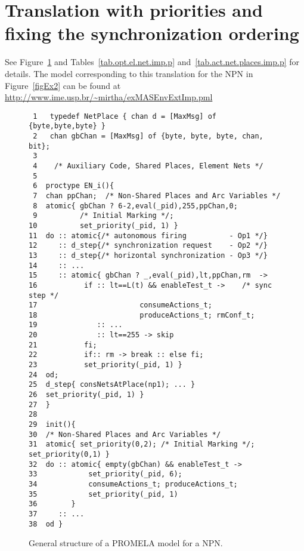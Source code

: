 \documentclass{llncs}
\begin{document}
\newpage
\section{Translation with priorities and fixing the synchronization ordering}
\label{app:imp.trans}

See Figure~\ref{figStructNPNimpP} and Tables~\ref{tab.opt.el.net.imp.p} and~\ref{tab.act.net.places.imp.p} for details. The model corresponding to this translation for the NPN in Figure~\ref{figEx2} can be found at \small\url{http://www.ime.usp.br/~mirtha/exMASEnvExtImp.pml}\nfont


\mfont
\begin{figure}[h!]
\begin{center}
\begin{verbatim}
 1   typedef NetPlace { chan d = [MaxMsg] of {byte,byte,byte} }
 2   chan gbChan = [MaxMsg] of {byte, byte, byte, chan, bit};
 3
 4    /* Auxiliary Code, Shared Places, Element Nets */
 5
 6  proctype EN_i(){
 7  chan ppChan;  /* Non-Shared Places and Arc Variables */
 8  atomic{ gbChan ? 6-2,eval(_pid),255,ppChan,0;
 9          /* Initial Marking */;
10          set_priority(_pid, 1) }
11  do :: atomic{/* autonomous firing          - Op1 */}
12     :: d_step{/* synchronization request    - Op2 */}
13     :: d_step{/* horizontal synchronization - Op3 */}
14     :: ...
15     :: atomic{ gbChan ? _,eval(_pid),lt,ppChan,rm  ->
16           if :: lt==L(t) && enableTest_t ->    /* sync step */
17                        consumeActions_t;
18                        produceActions_t; rmConf_t;
19              :: ...
20              :: lt==255 -> skip
21           fi;
22           if:: rm -> break :: else fi;
23           set_priority(_pid, 1) }
24  od;
25  d_step{ consNetsAtPlace(np1); ... }
26  set_priority(_pid, 1) }
27  }
28
29  init(){
30  /* Non-Shared Places and Arc Variables */
31  atomic{ set_priority(0,2); /* Initial Marking */; set_priority(0,1) }
32  do :: atomic{ empty(gbChan) && enableTest_t ->
33            set_priority(_pid, 6);
34            consumeActions_t; produceActions_t;
35            set_priority(_pid, 1)
36        }
37     :: ...
38  od }
\end{verbatim}
\end{center}
\vspace{-5pt}
\caption{General structure of a PROMELA model for a NPN.}
\label{figStructNPNimpP}
\end{figure}
\nfont
\end{document}
